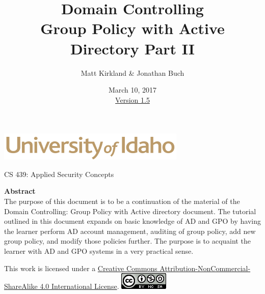 \documentclass[12pt]{extarticle}
\begin{document}
\title{ Domain Controlling \\ \large Group Policy with Active Directory Part II }
\author{Matt Kirkland \& Jonathan Buch}
\date{March 10, 2017 \\ \hyperref[changelog]{Version 1.5}} %
\renewcommand{\abstractname}{Summary}
\begin{titlepage}
\maketitle
{}
\begin{center}
\includegraphics[scale=.5]{UofI}

\large{CS 439: Applied Security Concepts}

\vskip 40pt

\textbf{Abstract}\\
The purpose of this document is to be a continuation of the material of the Domain Controlling: Group Policy with Active directory document. The tutorial outlined in this document expands on basic knowledge of AD and GPO by having the learner perform AD account management, auditing of group policy, add new group policy, and modify those policies further. The purpose is to acquaint the learner with AD and GPO systems in a very practical sense.

\end{center}


\vfill
\begin{center}
	This work is licensed under a \href{https://creativecommons.org/licenses/by-nc-sa/4.0/legalcode}{Creative Commons Attribution-NonCommercial-ShareAlike 4.0 International License}.
	\vskip 10pt
	\includegraphics[scale=.5]{cc}
\end{center}

\end{titlepage}


\pagebreak
\tableofcontents

\end{document}
